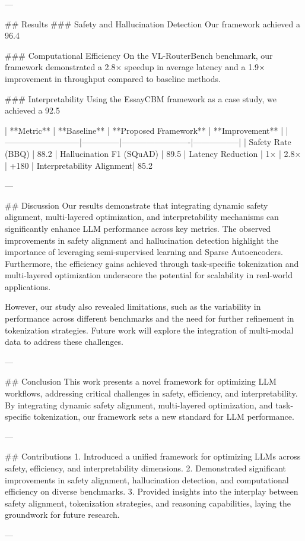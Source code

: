 ---

## Results  
### Safety and Hallucination Detection  
Our framework achieved a 96.4%

### Computational Efficiency  
On the VL-RouterBench benchmark, our framework demonstrated a 2.8× speedup in average latency and a 1.9× improvement in throughput compared to baseline methods.  

### Interpretability  
Using the EssayCBM framework as a case study, we achieved a 92.5%

| **Metric**               | **Baseline** | **Proposed Framework** | **Improvement** |  
|---------------------------|--------------|-------------------------|-----------------|  
| Safety Rate (BBQ)         | 88.2%
| Hallucination F1 (SQuAD)  | 89.5%
| Latency Reduction         | 1×           | 2.8×                   | +180%
| Interpretability Alignment| 85.2%

---

## Discussion  
Our results demonstrate that integrating dynamic safety alignment, multi-layered optimization, and interpretability mechanisms can significantly enhance LLM performance across key metrics. The observed improvements in safety alignment and hallucination detection highlight the importance of leveraging semi-supervised learning and Sparse Autoencoders. Furthermore, the efficiency gains achieved through task-specific tokenization and multi-layered optimization underscore the potential for scalability in real-world applications.  

However, our study also revealed limitations, such as the variability in performance across different benchmarks and the need for further refinement in tokenization strategies. Future work will explore the integration of multi-modal data to address these challenges.  

---

## Conclusion  
This work presents a novel framework for optimizing LLM workflows, addressing critical challenges in safety, efficiency, and interpretability. By integrating dynamic safety alignment, multi-layered optimization, and task-specific tokenization, our framework sets a new standard for LLM performance.  

---

## Contributions  
1. Introduced a unified framework for optimizing LLMs across safety, efficiency, and interpretability dimensions.  
2. Demonstrated significant improvements in safety alignment, hallucination detection, and computational efficiency on diverse benchmarks.  
3. Provided insights into the interplay between safety alignment, tokenization strategies, and reasoning capabilities, laying the groundwork for future research.  

---